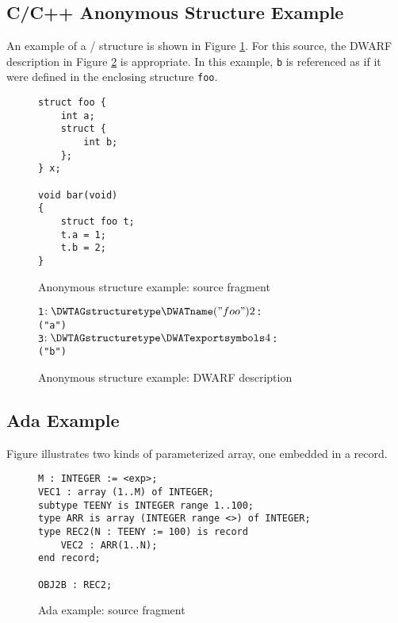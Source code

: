 \clearpage
\subsection{C/C++ Anonymous Structure Example}
\label{app:ccxxanonymousstructureexample}
An example of a / structure is shown in
Figure \ref{fig:anonymousstructureexamplesourcefragment}. 
For this source, the DWARF description in 
Figure \ref{fig:anonymousstructureexampledwarfdescription}
is appropriate. In this example, \texttt{b} is referenced as if it 
were defined in the enclosing structure \texttt{foo}.

\begin{figure}[h]
\begin{lstlisting}
struct foo {
    int a;
    struct {
        int b;
    };
} x;

void bar(void)
{
    struct foo t;
    t.a = 1;
    t.b = 2;
}

\end{lstlisting}
\caption{Anonymous structure example: source fragment}
\label{fig:anonymousstructureexamplesourcefragment}
\end{figure}

\begin{figure}[h]
\begin{dwflisting}
\begin{alltt}
1$:   \DWTAGstructuretype  
          \DWATname("foo")
2$:       \DWTAGmember
              \DWATname("a")
3$:       \DWTAGstructuretype
              \DWATexportsymbols
4$:           \DWTAGmember
                  \DWATname("b")
\end{alltt}
\end{dwflisting}
\caption{Anonymous structure example: DWARF description}
\label{fig:anonymousstructureexampledwarfdescription}
\end{figure}

\subsection{Ada Example}
\label{app:adaexample}
Figure 
illustrates two kinds of  
parameterized array, one embedded in a record.

\begin{figure}[h]
\begin{lstlisting}
M : INTEGER := <exp>;
VEC1 : array (1..M) of INTEGER;
subtype TEENY is INTEGER range 1..100;
type ARR is array (INTEGER range <>) of INTEGER;
type REC2(N : TEENY := 100) is record
    VEC2 : ARR(1..N);
end record;

OBJ2B : REC2;
\end{lstlisting}
\caption{Ada example: source fragment}
\label{fig:adaexamplesourcefragment}
\end{figure}

